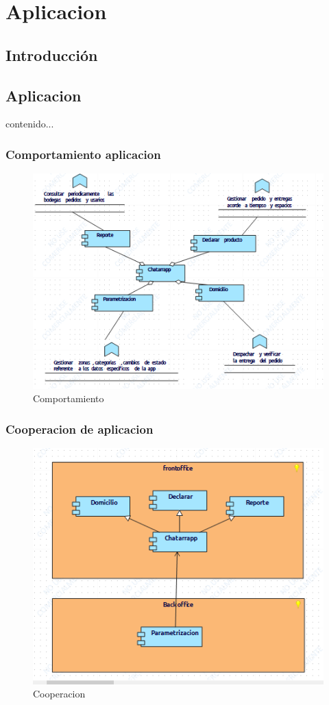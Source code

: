 \chapter{Aplicacion}

\section{Introducción}

\newpage

\section{Aplicacion}
contenido...

\subsection{Comportamiento aplicacion}
\begin{figure}[h!]
	\centering
	\includegraphics[width=0.8\linewidth]{Arquitectura/Aplicacion/imgs/Comportamiento aplicacion.png}
	\caption{Comportamiento}
\end{figure}
\newpage

\subsection{Cooperacion de aplicacion}
\begin{figure}[h!]
	\centering
	\includegraphics[width=0.8\linewidth]{Arquitectura/Aplicacion/imgs/Cooperacion de aplicacion.png}
	\caption{Cooperacion}
\end{figure}
\newpage

